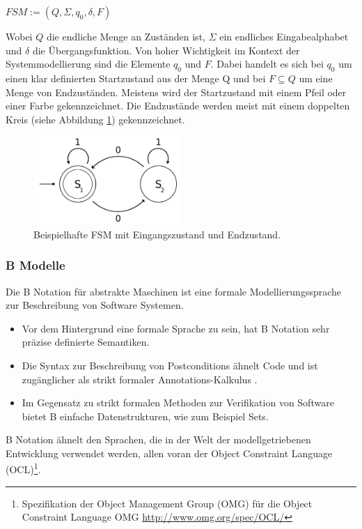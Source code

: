 \begin{center}
$FSM := (Q, \Sigma, q_0, \delta, F)$
\end{center}

Wobei $Q$ die endliche Menge an Zuständen ist, $\Sigma$ ein endliches Eingabealphabet und $\delta$ die Übergangsfunktion. Von hoher Wichtigkeit im Kontext der Systemmodellierung sind die Elemente $q_0$ und $F$. Dabei handelt es sich bei $q_0$ um einen klar definierten Startzustand aus der Menge Q und bei $F \subseteq Q$ um eine Menge von Endzuständen. Meistens wird der Startzustand mit einem Pfeil oder einer Farbe gekennzeichnet. Die Endzustände werden meist mit einem doppelten Kreis (siehe Abbildung \ref{fig:fsm_example}) gekennzeichnet.

\begin{figure}[h] 
  \centering
     \includegraphics[width=0.5\textwidth]{figures/FSM_example.png}
  \caption{Beispielhafte FSM mit Eingangszustand und Endzustand.}
  \label{fig:fsm_example}
\end{figure}

\subsubsection{B Modelle}
Die B Notation für abstrakte Maschinen ist eine formale Modellierungssprache zur Beschreibung von Software Systemen.
\begin{itemize}
\item Vor dem Hintergrund eine formale Sprache zu sein, hat B Notation sehr präzise definierte Semantiken.
\item Die Syntax zur Beschreibung von Postconditions ähnelt Code und ist zugänglicher als strikt formaler Annotations-Kalkulus \cite{huth_logic_2004}.
\item Im Gegensatz zu strikt formalen Methoden zur Verifikation von Software bietet B einfache Datenstrukturen, wie zum Beispiel Sets.
\end{itemize}

B Notation ähnelt den Sprachen, die in der Welt der modellgetriebenen Entwicklung verwendet werden, allen voran der Object Constraint Language (OCL)\footnote{Spezifikation der Object Management Group (OMG) für die Object Constraint Language \cite{warmer_object_2004} OMG \url{http://www.omg.org/spec/OCL/}}.


